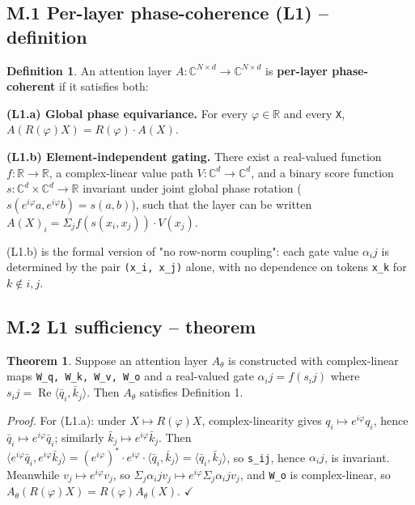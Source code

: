 \documentclass[11pt,a4paper]{article}
\theoremstyle{plain}
\theoremstyle{definition}
\renewcommand{\Re}{\operatorname{Re}}
\begin{document}
\subsection{M.1 Per-layer phase-coherence (L1) -- definition}
\textbf{Definition 1}. An attention layer $A : \mathbb{C}^{N\times d} \to  \mathbb{C}^{N\times d}$ is \textbf{per-layer phase-coherent} if it satisfies both:

\textbf{(L1.a) Global phase equivariance.} For every $\varphi  \in  \mathbb{R}$ and every \texttt{X},   $A(R(\varphi )X) = R(\varphi ) \cdot  A(X)$.

\textbf{(L1.b) Element-independent gating.} There exist a real-valued function $f : \mathbb{R} \to  \mathbb{R}$, a complex-linear value path $V : \mathbb{C}^d \to  \mathbb{C}^d$, and a binary score function $s : \mathbb{C}^d \times  \mathbb{C}^d \to  \mathbb{R}$ invariant under joint global phase rotation ($s(e^{i\varphi } a, e^{i\varphi } b) = s(a, b)$), such that the layer can be written   $A(X)_i = \Sigma _j f(s(x_i, x_j)) \cdot  V(x_j)$.

(L1.b) is the formal version of "no row-norm coupling": each gate value $\alpha _ij$ is determined by the pair \texttt{(x\_i, x\_j)} alone, with no dependence on tokens \texttt{x\_k} for $k \notin  {i, j}$.

\subsection{M.2 L1 sufficiency -- theorem}
\textbf{Theorem 1}. Suppose an attention layer $A_\theta $ is constructed with complex-linear maps \texttt{W\_q, W\_k, W\_v, W\_o} and a real-valued gate $\alpha _ij = f(s_ij)$ where $s_ij = \Re \langle \bar{q}_i, \bar{k}_j\rangle $. Then $A_\theta $ satisfies Definition 1.

\emph{Proof.} For (L1.a): under $X \mapsto  R(\varphi )X$, complex-linearity gives $q_i \mapsto  e^{i\varphi } q_i$, hence $\bar{q}_i \mapsto  e^{i\varphi } \bar{q}_i$; similarly $\bar{k}_j \mapsto  e^{i\varphi } \bar{k}_j$. Then $\langle e^{i\varphi } \bar{q}_i, e^{i\varphi } \bar{k}_j\rangle  = (e^{i\varphi })^* \cdot  e^{i\varphi } \cdot  \langle \bar{q}_i, \bar{k}_j\rangle  = \langle \bar{q}_i, \bar{k}_j\rangle $, so \texttt{s\_ij}, hence $\alpha _ij$, is invariant. Meanwhile $v_j \mapsto  e^{i\varphi } v_j$, so $\Sigma _j \alpha _ij v_j \mapsto  e^{i\varphi } \Sigma _j \alpha _ij v_j$, and \texttt{W\_o} is complex-linear, so $A_\theta (R(\varphi )X) = R(\varphi ) A_\theta (X)$. $\checkmark$
\end{document}
